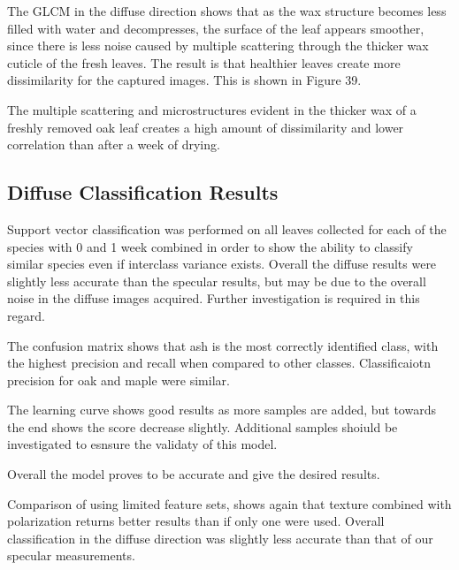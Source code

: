 The GLCM in the diffuse direction shows that as the wax structure becomes less filled with water and decompresses, the surface of the leaf appears smoother, since there is less noise caused by multiple scattering through the thicker wax cuticle of the fresh leaves.  The result is that healthier leaves create more dissimilarity for the captured images.  This is shown in Figure 39.
%
\begin{center}
\end{center}
%
The multiple scattering and microstructures evident in the thicker wax of a freshly removed oak leaf creates a high amount of dissimilarity and lower correlation than after a week of drying.

\subsection{Diffuse Classification Results}
Support vector classification was performed on all leaves collected for each of the species with 0 and 1 week combined in order to show the ability to classify similar species even if interclass variance exists.  Overall the diffuse results were slightly less accurate than the specular results, but may be due to the overall noise in the diffuse images acquired.  Further investigation is required in this regard.

The confusion matrix shows that ash is the most correctly identified class, with the highest precision and recall when compared to other classes.  Classificaiotn precision for oak and maple were similar.

The learning curve shows good results as more samples are added, but towards the end shows the score decrease slightly.  Additional samples shoiuld be investigated to esnsure the validaty of this model.

Overall the model proves to be accurate and give the desired results.
%
\begin{center}
\end{center}
%
%
\begin{center}
\end{center}
%
Comparison of using limited feature sets, shows again that texture combined with polarization returns better results than if only one were used.  Overall classification in the diffuse direction was slightly less accurate than that of our specular measurements.

